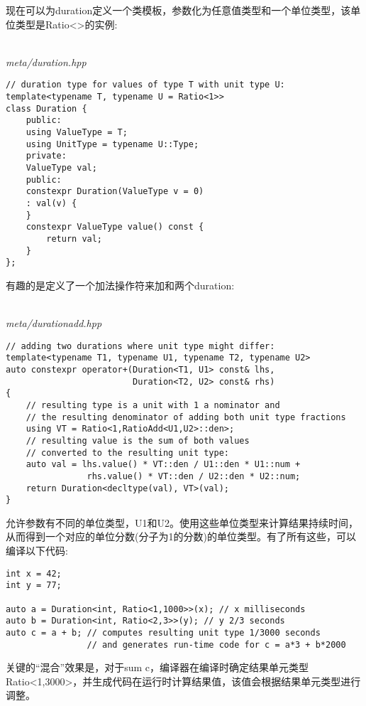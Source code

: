 现在可以为duration定义一个类模板，参数化为任意值类型和一个单位类型，该单位类型是Ratio<>的实例:

\hspace*{\fill} \\ %
\noindent
\textit{meta/duration.hpp}
\begin{lstlisting}[style=styleCXX]
// duration type for values of type T with unit type U:
template<typename T, typename U = Ratio<1>>
class Duration {
	public:
	using ValueType = T;
	using UnitType = typename U::Type;
	private:
	ValueType val;
	public:
	constexpr Duration(ValueType v = 0)
	: val(v) {
	}
	constexpr ValueType value() const {
		return val;
	}
};
\end{lstlisting}

有趣的是定义了一个加法操作符来加和两个duration:

\hspace*{\fill} \\ %
\noindent
\textit{meta/durationadd.hpp}
\begin{lstlisting}[style=styleCXX]
// adding two durations where unit type might differ:
template<typename T1, typename U1, typename T2, typename U2>
auto constexpr operator+(Duration<T1, U1> const& lhs,
						 Duration<T2, U2> const& rhs)
{
	// resulting type is a unit with 1 a nominator and
	// the resulting denominator of adding both unit type fractions
	using VT = Ratio<1,RatioAdd<U1,U2>::den>;
	// resulting value is the sum of both values
	// converted to the resulting unit type:
	auto val = lhs.value() * VT::den / U1::den * U1::num +
				rhs.value() * VT::den / U2::den * U2::num;
	return Duration<decltype(val), VT>(val);
}
\end{lstlisting}

允许参数有不同的单位类型，U1和U2。使用这些单位类型来计算结果持续时间，从而得到一个对应的单位分数(分子为1的分数)的单位类型。有了所有这些，可以编译以下代码:

\begin{lstlisting}[style=styleCXX]
int x = 42;
int y = 77;

auto a = Duration<int, Ratio<1,1000>>(x); // x milliseconds
auto b = Duration<int, Ratio<2,3>>(y); // y 2/3 seconds
auto c = a + b; // computes resulting unit type 1/3000 seconds
				// and generates run-time code for c = a*3 + b*2000
\end{lstlisting}

关键的“混合”效果是，对于sum c，编译器在编译时确定结果单元类型Ratio<1,3000>，并生成代码在运行时计算结果值，该值会根据结果单元类型进行调整。

